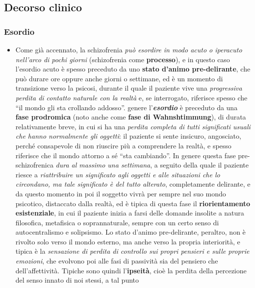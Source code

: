 \subsection{Decorso clinico}

\subsubsection{Esordio}

\begin{itemize}
\item
  Come già accennato, la schizofrenia \emph{può esordire in modo acuto o
  iperacuto nell'arco di pochi giorni} (schizofrenia come
  \textbf{processo}), e in questo caso l'esordio acuto è spesso
  preceduto da uno \textbf{stato d'animo pre-delirante}, che può durare
  ore oppure anche giorni o settimane, ed è un momento di transizione
  verso la psicosi, durante il quale il paziente vive una
  \emph{progressiva perdita di contatto naturale con la realtà} e, se
  interrogato, riferisce spesso che ``il mondo gli sta crollando
  addosso''. genere l'\textbf{\emph{esordio}} è preceduto da una
  \textbf{fase prodromica} (noto anche come \textbf{fase di
  Wahnshtimmung}), di durata relativamente breve, in cui si ha una
  \emph{perdita completa di tutti significati usuali che hanno
  normalmente gli oggetti}: il paziente si sente insicuro, angosciato,
  perché consapevole di non riuscire più a comprendere la realtà, e
  spesso riferisce che il mondo attorno a sé ``sta cambiando''. In
  genere questa fase pre-schizofrenica \emph{dura al massimo una
  settimana}, a seguito della quale il paziente riesce a
  \emph{riattribuire un significato agli oggetti e alle situazioni che
  lo circondano, ma tale significato è del tutto alterato},
  completamente delirante, e da questo momento in poi il soggetto vivrà
  per sempre nel suo mondo psicotico, distaccato dalla realtà, ed è
  tipica di questa fase il \textbf{riorientamento}
  \textbf{esistenziale}, in cui il paziente inizia a farsi delle domande
  insolite a natura filosofica, metafisica o soprannaturale, sempre con
  un certo senso di autocentralismo e solipsismo. Lo stato d'animo
  pre-delirante, peraltro, non è rivolto solo verso il mondo esterno, ma
  anche verso la propria interiorità, e tipica è la \emph{sensazione di
  perdita di controllo sui propri pensieri e sulle proprie emozioni},
  che evolvono poi alle fasi di passività sia del pensiero che
  dell'affettività. Tipiche sono quindi l'\textbf{ipseità}, cioè la
  perdita della percezione del senso innato di noi stessi, a tal punto

\end{itemize}
